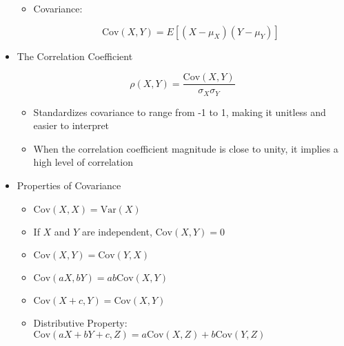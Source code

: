 \begin{itemize}
\begin{itemize}
      \item Covariance:

        $$\text{Cov}(X,Y)=E[(X-\mu_X)(Y-\mu_Y)]$$

    \end{itemize}

  \item The Correlation Coefficient

    $$\rho(X,Y)=\frac{\text{Cov}(X,Y)}{\sigma_X\sigma_Y}$$

    \begin{itemize}

      \item Standardizes covariance to range from -1 to 1, making it unitless and easier to interpret

      \item When the correlation coefficient magnitude is close to unity, it implies a high level of correlation

    \end{itemize}

  \item Properties of Covariance

    \begin{itemize}

      \item $\text{Cov}(X,X)=\text{Var}(X)$

      \item If $X$ and $Y$ are independent, $\text{Cov}(X,Y)=0$

      \item $\text{Cov}(X,Y)=\text{Cov}(Y,X)$

      \item $\text{Cov}(aX,bY)=ab\text{Cov}(X,Y)$

      \item $\text{Cov}(X+c,Y)=\text{Cov}(X,Y)$

      \item Distributive Property: $\text{Cov}(aX+bY+c,Z)=a\text{Cov}(X,Z)+b\text{Cov}(Y,Z)$

    \end{itemize}

\end{itemize}



